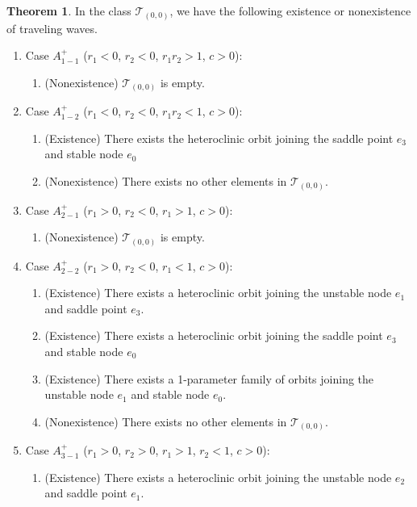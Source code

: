 \documentclass{amsart}
\theoremstyle{definition}
\newtheorem{theorem}{Theorem}
\numberwithin{equation}{section}
\begin{document}
\begin{theorem} \label{main} In the class $\mathcal{T}_{(0,0)}$, we have the following existence or nonexistence of traveling waves.

\begin{enumerate}
 \item Case $A_{1-1}^+$ ($r_1<0$, $r_2<0$, $r_1r_2>1$, $c>0$):
 \begin{enumerate}
  \item (Nonexistence) $\mathcal{T}_{(0,0)}$ is empty.
 \end{enumerate}
 \item Case $A_{1-2}^+$ ($r_1<0$, $r_2<0$, $r_1r_2<1$, $c>0$):
 \begin{enumerate}
  \item (Existence) There exists the heteroclinic orbit joining the saddle point $e_3$ and stable node $e_0$
  \item (Nonexistence) There exists no other elements in $\mathcal{T}_{(0,0)}$.
 \end{enumerate}
 \item Case $A_{2-1}^+$ ($r_1>0$, $r_2<0$, $r_1 >1$, $c>0$):
 \begin{enumerate}
  \item (Nonexistence) $\mathcal{T}_{(0,0)}$ is empty.
 \end{enumerate}
 \item Case $A_{2-2}^+$  ($r_1>0$, $r_2<0$, $r_1<1$, $c>0$):
 \begin{enumerate}
  \item (Existence) There exists a heteroclinic orbit joining the unstable node $e_1$ and saddle point $e_3$. 
  \item (Existence) There exists a heteroclinic orbit joining the saddle point $e_3$ and stable node $e_0$
  \item (Existence) There exists a 1-parameter family of orbits joining the unstable node $e_1$ and stable node $e_0$.
  \item (Nonexistence) There exists no other elements in $\mathcal{T}_{(0,0)}$.
 \end{enumerate}
 \item Case $A_{3-1}^+$ ($r_1>0$, $r_2>0$, $r_1 >1$, $r_2<1$, $c>0$):
 \begin{enumerate}
   \item (Existence) There exists a heteroclinic orbit joining the unstable node $e_2$ and saddle point $e_1$.

\end{enumerate}
\end{enumerate}
\end{theorem}
\end{document}
